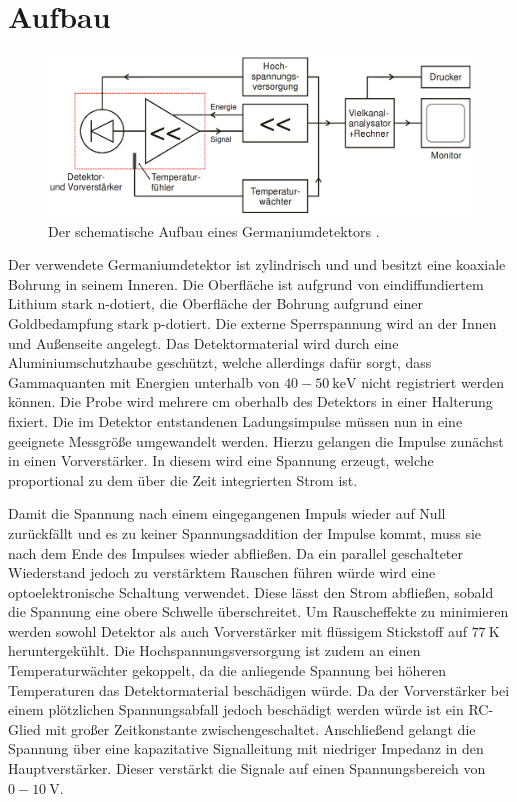 \section{Aufbau}
\label{sec:Aufbau}

\begin{figure}
	\centering
	\includegraphics[width=\linewidth-100pt,height=\textheight-100pt,keepaspectratio]{content/Images/detektor.png}
    \caption{Der schematische Aufbau eines Germaniumdetektors \cite{V18}.}
    \label{fig:detektor}
\end{figure}

Der verwendete Germaniumdetektor ist zylindrisch und und besitzt eine koaxiale Bohrung in seinem Inneren. Die Oberfläche ist aufgrund von eindiffundiertem Lithium stark n-dotiert, die Oberfläche der Bohrung aufgrund einer Goldbedampfung stark p-dotiert. Die externe Sperrspannung wird an der Innen und Außenseite angelegt. Das Detektormaterial wird durch eine Aluminiumschutzhaube geschützt, welche allerdings dafür sorgt, dass Gammaquanten mit Energien unterhalb von $40-\SI{50}{\kilo\electronvolt}$ nicht registriert werden können. Die Probe wird mehrere $\si{\centi\meter}$ oberhalb des Detektors in einer Halterung fixiert. Die im Detektor entstandenen Ladungsimpulse müssen nun in eine geeignete Messgröße umgewandelt werden. Hierzu gelangen die Impulse zunächst in einen Vorverstärker. In diesem wird eine Spannung erzeugt, welche proportional zu dem über die Zeit integrierten Strom ist.

Damit die Spannung nach einem eingegangenen Impuls wieder auf Null zurückfällt und es zu keiner Spannungsaddition der Impulse kommt, muss sie nach dem Ende des Impulses wieder abfließen. Da ein parallel geschalteter Wiederstand jedoch zu verstärktem Rauschen führen würde wird eine optoelektronische Schaltung verwendet. Diese lässt den Strom abfließen, sobald die Spannung eine obere Schwelle überschreitet. Um Rauscheffekte zu minimieren werden sowohl Detektor als auch Vorverstärker mit flüssigem Stickstoff auf $\SI{77}{\kelvin}$ heruntergekühlt. Die Hochspannungsversorgung ist zudem an einen Temperaturwächter gekoppelt, da die anliegende Spannung bei höheren Temperaturen das Detektormaterial beschädigen würde. Da der Vorverstärker bei einem plötzlichen Spannungsabfall jedoch beschädigt werden würde ist ein RC-Glied mit großer Zeitkonstante zwischengeschaltet. Anschließend gelangt die Spannung über eine kapazitative Signalleitung mit niedriger Impedanz in den Hauptverstärker. Dieser verstärkt die Signale auf einen Spannungsbereich von $0 - \SI{10}{\volt}$. 

